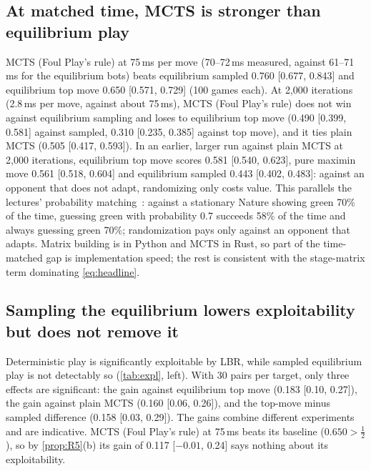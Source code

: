 \documentclass[10pt]{article}
\theoremstyle{plain}
\theoremstyle{definition}
\theoremstyle{remark}
\begin{document}
\subsection{At matched time, MCTS is stronger than equilibrium play}
\label{sec:exp-strength}
MCTS (Foul Play's rule) at 75\,ms per move (70--72\,ms measured, against 61--71\,ms for the equilibrium bots) beats equilibrium sampled 0.760 [0.677, 0.843] and equilibrium top move 0.650 [0.571, 0.729] (100 games each). At 2,000 iterations (2.8\,ms per move, against about 75\,ms), MCTS (Foul Play's rule) does not win against equilibrium sampling and loses to equilibrium top move (0.490 [0.399, 0.581] against sampled, 0.310 [0.235, 0.385] against top move), and it ties plain MCTS (0.505 [0.417, 0.593]). In an earlier, larger run against plain MCTS at 2,000 iterations, equilibrium top move scores 0.581 [0.540, 0.623], pure maximin move 0.561 [0.518, 0.604] and equilibrium sampled 0.443 [0.402, 0.483]: against an opponent that does not adapt, randomizing only costs value. This parallels the lectures' probability matching~\cite{CS535L6}: against a stationary Nature showing green 70\% of the time, guessing green with probability 0.7 succeeds 58\% of the time and always guessing green 70\%; randomization pays only against an opponent that adapts. Matrix building is in Python and MCTS in Rust, so part of the time-matched gap is implementation speed; the rest is consistent with the stage-matrix term dominating \eqref{eq:headline}.

\subsection{Sampling the equilibrium lowers exploitability but does not remove it}
\label{sec:exp-expl}
Deterministic play is significantly exploitable by LBR, while sampled equilibrium play is not detectably so (\cref{tab:expl}, left). With 30 pairs per target, only three effects are significant: the gain against equilibrium top move (0.183 [0.10, 0.27]), the gain against plain MCTS (0.160 [0.06, 0.26]), and the top-move minus sampled difference (0.158 [0.03, 0.29]). The gains combine different experiments and are indicative. MCTS (Foul Play's rule) at 75\,ms beats its baseline ($0.650>\frac12$), so by \cref{prop:R5}(b) its gain of 0.117 [$-0.01$, 0.24] says nothing about its exploitability.
\end{document}
